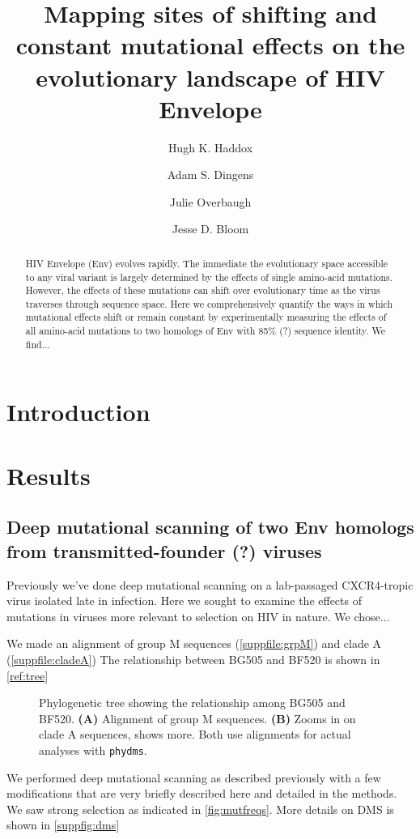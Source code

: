 \documentclass[9pt,lineno]{elife}
\title{Mapping sites of shifting and constant mutational effects on the evolutionary landscape of HIV Envelope}
\author[1,2\authfn{1}]{Hugh K. Haddox}
\author[1,2\authfn{1}]{Adam S. Dingens}
\author[3]{Julie Overbaugh}
\author[1,2,4]{Jesse D. Bloom}
\affil[1]{Basic Sciences and Computational Biology Program, Fred Hutchinson Cancer Research Center, Seattle, WA}
\affil[2]{Molecular and Cellular Biology PhD program, University of Washington, Seattle, WA}
\begin{document}
\maketitle

\begin{abstract}
HIV Envelope (Env) evolves rapidly.
The immediate the evolutionary space accessible to any viral variant is largely determined by the effects of single amino-acid mutations.
However, the effects of these mutations can shift over evolutionary time as the virus traverses through sequence space.
Here we comprehensively quantify the ways in which mutational effects shift or remain constant by experimentally measuring the effects of all amino-acid mutations to two homologs of Env with 85\% (?) sequence identity.
We find...
\end{abstract}


\section{Introduction}


\section{Results}

\subsection*{Deep mutational scanning of two Env homologs from transmitted-founder (?) viruses}
Previously we've done deep mutational scanning on a lab-passaged CXCR4-tropic virus isolated late in infection.
Here we sought to examine the effects of mutations in viruses more relevant to selection on HIV in nature.
We chose...

We made an alignment of group M sequences (\ref{suppfile:grpM}) and clade A (\ref{suppfile:cladeA})
The relationship between BG505 and BF520 is shown in \ref{ref:tree}

\begin{figure}
\caption{\label{fig:tree}
Phylogenetic tree showing the relationship among BG505 and BF520.
{\bf(A)} Alignment of group M sequences.
{\bf(B)} Zooms in on clade A sequences, shows more.
Both use alignments for actual analyses with \texttt{phydms}.}
\end{figure}

We performed deep mutational scanning as described previously with a few modifications that are very briefly described here and detailed in the methods.
We saw strong selection as indicated in \ref{fig:mutfreqs}.
More details on DMS is shown in \ref{suppfig:dms}
\end{document}
